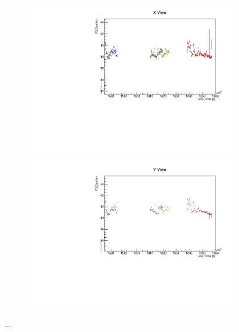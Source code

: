 \documentclass[12pt,a4paper]{article}
\begin{document}
\begin{figure}[!ht]
\begin{subfigure}{0.5\textwidth}
  \end{subfigure}
  \begin{subfigure}{0.5\textwidth}
    \includegraphics[width=\linewidth]{driftsec_tb/pecorrcm_time_x.pdf}
  \end{subfigure}
  \begin{subfigure}{0.5\textwidth}
    \includegraphics[width=\linewidth]{driftsec_tb/pecorrcm_time_y.pdf}
  \end{subfigure}
  \caption{...}
  \label{figAbsCalibDrift1}
\end{figure}
\end{document}
